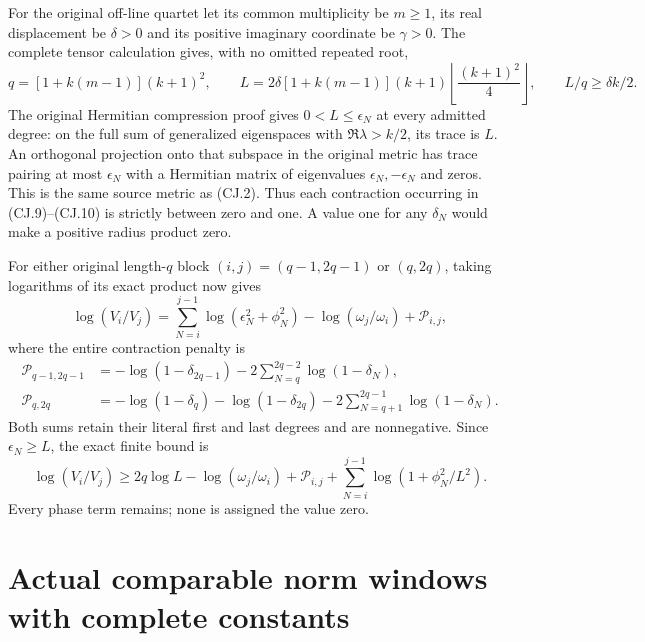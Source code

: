 \documentclass[11pt]{article}
\begin{document}
For the original off-line quartet let its common multiplicity
be $m\ge1$, its real displacement be $\delta>0$ and its
positive imaginary coordinate be $\gamma>0$. The complete
tensor calculation gives, with no omitted repeated root,
\[
 q=[1+k(m-1)](k+1)^2,\qquad
 L=2\delta[1+k(m-1)](k+1)
              \left\lfloor\frac{(k+1)^2}{4}\right\rfloor,
 \qquad L/q\ge\delta k/2.
 \tag{CJ.11}
\]
The original Hermitian compression proof gives
$0<L\le\epsilon_N$ at every admitted degree: on the full
sum of generalized eigenspaces with $\Re\lambda>k/2$, its
trace is $L$. An orthogonal projection onto that subspace in
the original metric has trace pairing at most $\epsilon_N$
with a Hermitian matrix of eigenvalues $\epsilon_N,-\epsilon_N$
and zeros. This is the same source metric as (CJ.2).
Thus each contraction occurring in (CJ.9)--(CJ.10) is strictly
between zero and one. A value one for any $\delta_N$ would
make a positive radius product zero.

For either original length-$q$ block $(i,j)=(q-1,2q-1)$ or
$(q,2q)$, taking logarithms of its exact product now gives
\[
 \log(V_i/V_j)
 =\sum_{N=i}^{j-1}\log(\epsilon_N^2+\phi_N^2)
       -\log(\omega_j/\omega_i)+\mathcal P_{i,j},
 \tag{CJ.12}
\]
where the entire contraction penalty is
\[
 \begin{split}
 \mathcal P_{q-1,2q-1}
 &=-\log(1-\delta_{2q-1})
       -2\sum_{N=q}^{2q-2}\log(1-\delta_N),\\
 \mathcal P_{q,2q}
 &=-\log(1-\delta_q)-\log(1-\delta_{2q})
       -2\sum_{N=q+1}^{2q-1}\log(1-\delta_N).
 \end{split}
 \tag{CJ.13}
\]
Both sums retain their literal first and last degrees and are
nonnegative. Since $\epsilon_N\ge L$, the exact finite bound is
\[
 \log(V_i/V_j)\ge2q\log L-\log(\omega_j/\omega_i)
   +\mathcal P_{i,j}
   +\sum_{N=i}^{j-1}\log(1+\phi_N^2/L^2).
 \tag{CJ.14}
\]
Every phase term remains; none is assigned the value zero.

\section{Actual comparable norm windows with complete constants}
\end{document}
